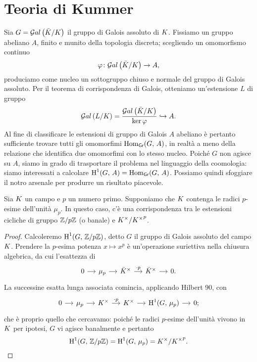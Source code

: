 \section{Teoria di Kummer}


Sia $ G = \mathcal{G}al\left( \bar{K}/ K \right) $ il gruppo di Galois assoluto di $ K $. Fissiamo un gruppo abeliano $ A $, finito e munito della topologia discreta; scegliendo un omomorfismo continuo
\[ \varphi \colon \mathcal{G}al\left( \bar{K}/ K \right) \to A, \]
produciamo come nucleo un sottogruppo chiuso e normale del gruppo di Galois assoluto. Per il teorema di corrispondenza di Galois, otteniamo un'estensione $ L $ di gruppo
\[ \mathcal{G}al\left( L/K \right) = \frac{\mathcal{G}al\left( \bar{K}/ K \right)}{\ker \varphi} \hookrightarrow A. \]
Al fine di classificare le estensioni di gruppo di Galois $ A $ abeliano è pertanto sufficiente trovare tutti gli omomorfimi $ \operatorname{Hom}_{\textsf{Gr}}(G, \, A) $, in realtà a meno della relazione che identifica due omomorfimi con lo stesso nucleo. Poiché $ G $ non agisce su $ A $, siamo in grado di trasportare il problema nel linguaggio della coomologia: siamo interessati a calcolare $ \operatorname{H}^1(G, \, A) = \operatorname{Hom}_{\textsf{Gr}}(G, \, A) $. Possiamo quindi sfoggiare il notro arsenale per produrre un risultato piacevole.

\begin{theorem}[di Kummer]
	Sia $ K $ un campo e $ p $ un numero primo. Supponiamo che $ K $ contenga le radici $ p $-esime dell'unità $ \mu_p $. In questo caso, c'è una corrispondenza tra le estensioni cicliche di gruppo $ \mathbb{Z}/p\mathbb{Z} $ (o banale) e $ K^\times / {K^\times}^p $.
\end{theorem}
\begin{proof}
	Calcoleremo $ \operatorname{H}^1(G, \, \mathbb{Z}/p\mathbb{Z}) $, detto $ G $ il gruppo di Galois assoluto del campo $ K $. Prendere la $ p $-esima potenza $ x \mapsto x^p $ è un'operazione suriettiva nella chiusura algebrica, da cui l'esattezza di
	\[\begin{tikzcd}[column sep = small]
	0 \rar
	& \mu_p \rar
	& \bar{\K}^\times \rar["\cdot p"]
	& \bar{\K}^\times \rar
	& 0.
	\end{tikzcd}  \]
	La successine esatta lunga associata comincia, applicando Hilbert 90, con
	\[\begin{tikzcd}[column sep = small]
	0 \rar
	& \mu_p \rar
	& \K^\times \rar["\cdot p"]
	& \K^\times \rar
	& \HH^1(G, \, \mu_p) \rar
	& 0;
	\end{tikzcd}  \]
	che è proprio quello che cercavamo: poiché le radici $ p $-esime dell'unità vivono in $ K $ per ipotesi, $ G $ vi agisce banalmente e pertanto
	\[ \operatorname{H}^1(G, \, \mathbb{Z}/p\mathbb{Z}) = \operatorname{H}^1(G, \, \mu_p) =K^\times / {K^\times}^p . \]
\end{proof}

